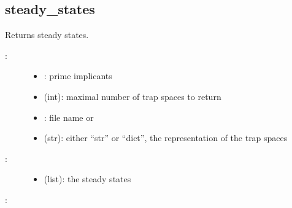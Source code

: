 \documentclass[letterpaper,10pt,english]{sphinxmanual}
\begin{document}
\subsection{steady\_states}
\label{\detokenize{AspSolver:steady-states}}\label{\detokenize{AspSolver:id3}}

\begin{fulllineitems}
\label{\detokenize{AspSolver:PyBoolNet.AspSolver.steady_states}}
Returns steady states.
\begin{description}
\item[{:}] \leavevmode\begin{itemize}
\item {} 
: prime implicants

\item {} 
 (int): maximal number of trap spaces to return

\item {} 
: file name or 

\item {} 
 (str): either “str” or “dict”, the representation of the trap spaces

\end{itemize}

\item[{:}] \leavevmode\begin{itemize}
\item {} 
 (list): the steady states

\end{itemize}

\end{description}

:

\begin{sphinxVerbatim}[commandchars=\\\{\}]
  
\end{sphinxVerbatim}

\end{fulllineitems}
\end{document}
